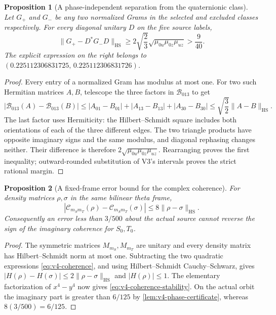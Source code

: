\documentclass[11pt]{article}
\newtheorem{proposition}[proposition]{Proposition}
\theoremstyle{definition}
\theoremstyle{remark}
\newcommand{\HS}{\mathrm{HS}}
\newcommand{\norm}[1]{\lVert#1\rVert}
\begin{document}
\begin{proposition}[A phase-independent separation from the quaternionic class]
\label{prop:v4-triangle-margin}
Let $G_+$ and $G_-$ be any two normalized Grams in the selected and excluded
classes respectively. For every diagonal unitary $D$ on the five source
labels,
\begin{equation}
 \boxed{\norm{G_+-D^*G_-D}_{\HS}
 \ge 2\sqrt{\frac23}\sqrt{\mu_{0u}\mu_{0z}\mu_{uz}}
 >\frac9{40}.}
 \label{eq:v4-rephasing-margin}
\end{equation}
The explicit expression on the right belongs to
$(0.225112306831725,\,0.225112306831726)$.
\end{proposition}
\begin{proof}
Every entry of a normalized Gram has modulus at most one. For two such
Hermitian matrices $A,B$, telescope the three factors in
$\mathcal B_{013}$ to get
\[
 |\mathcal B_{013}(A)-\mathcal B_{013}(B)|
 \le |A_{01}-B_{01}|+|A_{13}-B_{13}|+|A_{30}-B_{30}|
 \le\sqrt{\frac32}\norm{A-B}_{\HS}.
\]
The last factor uses Hermiticity: the Hilbert--Schmidt square includes both
orientations of each of the three different edges. The two triangle
products have opposite imaginary signs and the same modulus, and diagonal
rephasing changes neither. Their difference is therefore
$2\sqrt{\mu_{0u}\mu_{0z}\mu_{uz}}$. Rearranging proves the first
inequality; outward-rounded substitution of V3's intervals proves the
strict rational margin.
\end{proof}

\begin{proposition}[A fixed-frame error bound for the complex coherence]
\label{prop:v4-coherence-stability}
For density matrices $\rho,\sigma$ in the same bilinear theta frame,
\begin{equation}
 |\mathcal C_{m_Sm_T}(\rho)-\mathcal C_{m_Sm_T}(\sigma)|
 \le 8\norm{\rho-\sigma}_{\HS}.
 \label{eq:v4-coherence-stability}
\end{equation}
Consequently an error less than $3/500$ about the actual source cannot
reverse the sign of the imaginary coherence for $S_0,T_0$.
\end{proposition}
\begin{proof}
The symmetric matrices $M_{m_S},M_{m_T}$ are unitary and every density
matrix has Hilbert--Schmidt norm at most one. Subtracting the two quadratic
expressions \eqref{eq:v4-coherence}, and using Hilbert--Schmidt
Cauchy--Schwarz, gives
$|H(\rho)-H(\sigma)|\le2\norm{\rho-\sigma}_{\HS}$ and $|H(\rho)|\le1$.
The elementary factorization of $x^4-y^4$ now gives
\eqref{eq:v4-coherence-stability}. On the actual orbit the imaginary
part is greater than $6/125$ by \cref{lem:v4-phase-certificate}, whereas
$8(3/500)=6/125$.
\end{proof}
\end{document}

